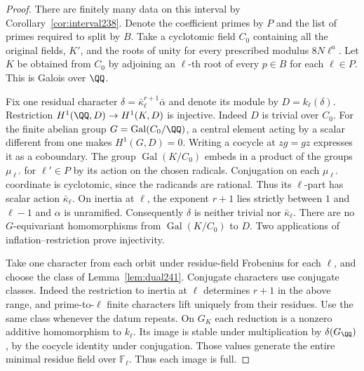 \documentclass[a4paper,11pt]{article}
\theoremstyle{definition}
\theoremstyle{remark}
\numberwithin{equation}{section}
\begin{document}
\begin{proof}
There are finitely many data on this interval by
Corollary~\ref{cor:interval238}. Denote the coefficient primes
by \(P\) and the list of primes required to split by \(B\).
Take a cyclotomic field \(C_0\) containing all the original
fields, \(K'\), and the roots of unity for every prescribed
modulus \(8N\ell^a\). Let \(K\) be obtained from \(C_0\) by
adjoining an \(\ell\)-th root of every \(p\in B\) for each
\(\ell\in P\). This is Galois over \(\QQ\).

Fix one residual character \(\delta=\bar\kappa_\ell^{r+1}
\bar\alpha\) and denote its module by \(D=k_\ell(\delta)\).
Restriction \(H^1(\QQ,D)\to H^1(K,D)\) is injective.
Indeed \(D\) is trivial over \(C_0\). For the finite abelian
group \(G=\operatorname{Gal}(C_0/\QQ)\), a central element
acting by a scalar different from one makes \(H^1(G,D)=0\).
Writing a cocycle at \(zg=gz\) expresses it as a coboundary.
The group \(\operatorname{Gal}(K/C_0)\) embeds in a product
of the groups \(\mu_{\ell'}\) for \(\ell'\in P\) by its action
on the chosen radicals. Conjugation on each \(\mu_{\ell'}\)
coordinate is cyclotomic, since the radicands are rational.
Thus its \(\ell\)-part has scalar action \(\bar\kappa_\ell\).
On inertia at \(\ell\), the exponent \(r+1\) lies strictly
between \(1\) and \(\ell-1\) and \(\alpha\) is unramified.
Consequently \(\delta\) is neither trivial nor
\(\bar\kappa_\ell\). There are no \(G\)-equivariant
homomorphisms from \(\operatorname{Gal}(K/C_0)\) to \(D\).
Two applications of inflation--restriction prove injectivity.

Take one character from each orbit under residue-field
Frobenius for each \(\ell\), and choose the class of
Lemma~\ref{lem:dual241}. Conjugate characters use
conjugate classes. Indeed the restriction to inertia at
\(\ell\) determines \(r+1\) in the above range, and
prime-to-\(\ell\) finite characters lift uniquely from their
residues. Use the same class whenever the datum repeats.
On \(G_K\) each reduction is a nonzero additive
homomorphism to \(k_\ell\). Its image is stable under
multiplication by \(\delta(G_\QQ)\), by the cocycle identity
under conjugation. Those values generate the entire minimal
residue field over \(\mathbb F_\ell\). Thus each image is full.


\end{proof}
\end{document}
